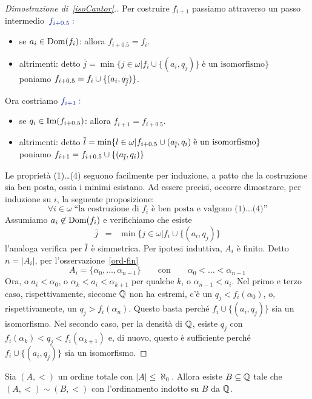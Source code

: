 \begin{proof}[Dimostrazione di~\ref{isoCantor}.]
Per costruire $f_{i+1}$ passiamo attraverso un passo intermedio~$\drkblu
f_{i+0.5}:$
	\begin{itemize}
		\item se $a_i \in \operatorname{Dom}(f_i)$: allora $f_{i + 0.5} = f_i$.
		\item altrimenti: detto $\overline{j} =
\min\{j \in \omega | f_i \cup \{(a_i,q_j)\} \; \text{\`e un
isomorfismo}\}$\\ poniamo $f_{i + 0.5} = f_i \cup \{(a_i,q_{\overline j})\}$.
	\end{itemize}

Ora costriamo $\drkblu f_{i+1}:$
	\begin{itemize}
		\item se $q_i \in \operatorname{Im}(f_{i + 0.5})$: allora $f_{i + 1} = f_{i + 0.5}$.
		\item altrimenti: detto $\overline l =
\min\{l \in \omega | f_{i + 0.5} \cup (a_{\overline l},q_i) \; \text{\`e
un isomorfismo}\}$\\
poniamo $f_{i + 1} = f_{i+0.5} \cup \{(a_{\overline l},q_i)\}$
	\end{itemize}
	Le propriet\`a (1)\ldots(4) seguono facilmente per induzione, a patto che la costruzione sia ben posta, ossia i minimi esistano. 
	Ad essere precisi, occorre dimostrare, per induzione su $i$, la seguente proposizione:
	\[ \forall i \in \omega \; \text{``la costruzione di $f_i$ \`e ben
posta e valgono (1)\ldots(4)''}
		\]
Assumiamo $a_i\not\in\operatorname{Dom}(f_i)$
	e verifichiamo che esiste
\[
	\overline{j}\;\;=\;\;\min\{j \in \omega | f_i \cup \{(a_i,q_j)\}
\]
l'analoga verifica per $\overline l$ \`e simmetrica.
	Per ipotesi induttiva, $A_i$ \`e finito. Detto $n = |A_i|$,
per l'osservazione~\ref{ord-fin}
	\[ A_i = \{\alpha_0,\ldots,\alpha_{n-1}\} \qquad\text{con} \qquad\alpha_0<\ldots<\alpha_{n-1}
		\]
	Ora, o $a_i <\alpha_0$, o $\alpha_k < a_i < \alpha_{k+1}$ per
	qualche $k$, o $\alpha_{n-1}<a_i$. Nel primo e terzo caso,
rispettivamente, siccome $\mathbb Q$ non ha estremi, c'\`e un $q_j <
f_i(\alpha_0)$, o, rispettivamente, un $q_j > f_i(\alpha_n)$. Questo basta
perch\'e $f_i \cup \{(a_i,q_j)\}$ sia un isomorfismo.
	Nel secondo caso, per la densit\`a di $\mathbb Q$, esiste $q_j$ con
$f_i(\alpha_k)<q_j<f_i(\alpha_{k+1})$ e, di nuovo, questo \`e sufficiente
perch\'e $f_i  \cup \{(a_i,q_j)\}$ sia un isomorfismo.
\end{proof}

\begin{corollary}\label{cor-emb-ord-num}
	Sia $(A,<)$ un ordine totale con $|A| \leq \aleph_0$. Allora esiste $B \subseteq \mathbb Q$ tale che $(A,<) \sim (B,<)$ con l'ordinamento indotto su $B$ da $\mathbb Q$.
\end{corollary}

